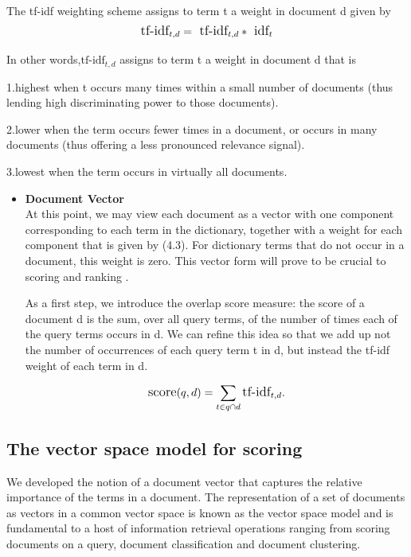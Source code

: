 The tf-idf weighting scheme assigns to term t a weight in document d given by
\begin{equation}
    \large
     \text{tf-idf}_{t,d} =\text{ tf-idf}_{t,d } *\text{ idf}_{t} \end{equation}  
     
In other words,$\text{tf-idf}_{t,d}$  assigns to term t a weight in document d that is

1.\hspace{3pt}highest when t occurs many times within a small number of documents
(thus lending high discriminating power to those documents).

2.\hspace{3pt}lower when the term occurs fewer times in a document, or occurs in many
documents (thus offering a less pronounced relevance signal).

3.\hspace{3pt}lowest when the term occurs in virtually all documents.     

\begin{itemize}
     \item \textbf{Document Vector}\\
    At this point, we may view each document as a vector with one component
    corresponding to each term in the dictionary, together with a weight for each component that is given by (4.3). 
    For dictionary terms that do not occur in a document, this weight is zero. This vector form will prove to be crucial to scoring and ranking .

    As a first step, we introduce the overlap score measure: the score of a document d is the sum, over all query terms, of the number of times each of the query terms occurs in d. We can refine this idea so that we add up not the number of occurrences of each query term t in d, but instead the tf-idf weight of each term in d.
   
   \begin{equation}
        \large
         \text{score}(q,d) =\sum_{t \in q\cap d} \text{tf-idf}_{t,d}. \end{equation}
\end{itemize}


\subsection{The vector space model for scoring}

We developed the notion of a document vector that captures the relative importance of the terms in a document. 
The representation of a set of documents as vectors in a common vector space is known as the vector space model and is fundamental to a host of information retrieval operations ranging from scoring documents on a query, document classification and document clustering.

